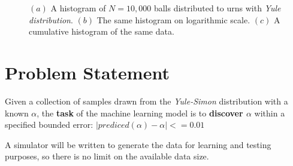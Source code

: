 \documentclass[a4paper, 12pt]{report}
\begin{document}
\begin{figure}[ht]
\centering
    \hspace{0.5cm}
    \hspace{0.5cm}
    \label{fig:1}
    \caption[Yule process histograms]{
        $(a)$ A histogram of $N=10,000$ balls distributed to urns with \textit{Yule distribution}.
        $(b)$ The same histogram on logarithmic scale.
        $(c)$ A cumulative histogram of the same data.
    }
\end{figure}

\section{Problem Statement}
\par Given a collection of samples drawn from the \textit{Yule-Simon} distribution with a known $\alpha$, the \textbf{task} of the machine learning model is to \textbf{discover $\alpha$} within a specified bounded error: $\mid prediced(\alpha) - \alpha \mid <= 0.01$

\par A simulator will be written to generate the data for learning and testing purposes, so there is no limit on the available data size.
\end{document}
